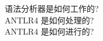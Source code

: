 
\begin{frame}{}
  \begin{center}
     语法分析器是如何工作的? \\[40pt]
    \pause
    ANTLR4 是如何处理的? \\[40pt]
    \pause
    ANTLR4 是如何进行的?
  \end{center}
\end{frame}

